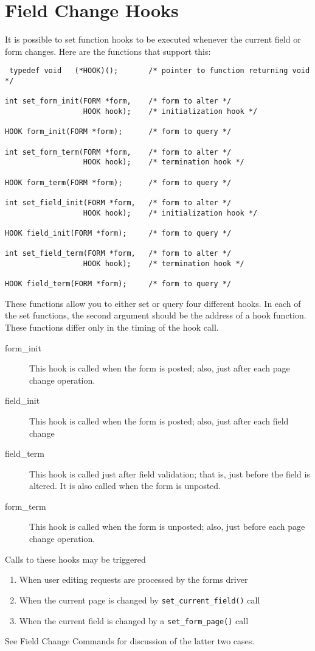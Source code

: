 \section{Field Change Hooks}

\label{f0:fhooks}It is possible to set function hooks to be executed whenever the
current field or form changes.  Here are the functions that support this:
\begin{verbatim} typedef void	(*HOOK)();       /* pointer to function returning void */

int set_form_init(FORM *form,    /* form to alter */
                  HOOK hook);    /* initialization hook */

HOOK form_init(FORM *form);      /* form to query */

int set_form_term(FORM *form,    /* form to alter */
                  HOOK hook);    /* termination hook */

HOOK form_term(FORM *form);      /* form to query */

int set_field_init(FORM *form,   /* form to alter */
                  HOOK hook);    /* initialization hook */

HOOK field_init(FORM *form);     /* form to query */

int set_field_term(FORM *form,   /* form to alter */
                  HOOK hook);    /* termination hook */

HOOK field_term(FORM *form);     /* form to query */
\end{verbatim}
These functions allow you to either set or query four different hooks.
In each of the set functions, the second argument should be the
address of a hook function.  These functions differ only in the timing
of the hook call.
\begin{description}
\item[ form\_init]  This hook is called when the form is posted; also, just after
each page change operation.
\item[ field\_init]  This hook is called when the form is posted; also, just after
each field change
\item[ field\_term]  This hook is called just after field validation; that is, just before
the field is altered.  It is also called when the form is unposted.
\item[ form\_term]  This hook is called when the form is unposted; also, just before
each page change operation.
\end{description}
Calls to these hooks may be triggered
\begin{enumerate}
\item When user editing requests are processed by the forms driver
\item When the current page is changed by \texttt{set\_current\_field()} call
\item When the current field is changed by a \texttt{set\_form\_page()} call
\end{enumerate}
See \label{f0:ffocus}Field Change Commands for discussion of the latter
two cases. 

